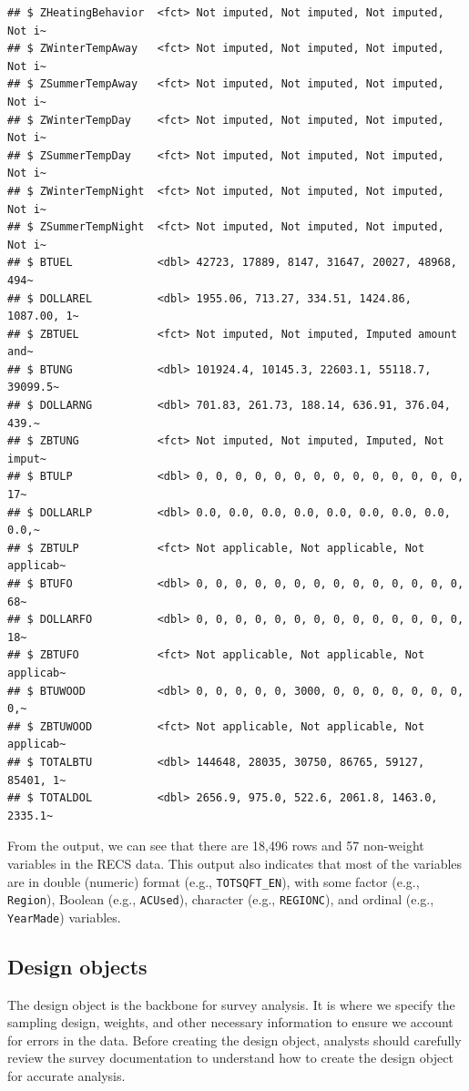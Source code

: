 \documentclass[
]{krantz}
\begin{document}
\begin{verbatim}
## $ ZHeatingBehavior  <fct> Not imputed, Not imputed, Not imputed, Not i~
## $ ZWinterTempAway   <fct> Not imputed, Not imputed, Not imputed, Not i~
## $ ZSummerTempAway   <fct> Not imputed, Not imputed, Not imputed, Not i~
## $ ZWinterTempDay    <fct> Not imputed, Not imputed, Not imputed, Not i~
## $ ZSummerTempDay    <fct> Not imputed, Not imputed, Not imputed, Not i~
## $ ZWinterTempNight  <fct> Not imputed, Not imputed, Not imputed, Not i~
## $ ZSummerTempNight  <fct> Not imputed, Not imputed, Not imputed, Not i~
## $ BTUEL             <dbl> 42723, 17889, 8147, 31647, 20027, 48968, 494~
## $ DOLLAREL          <dbl> 1955.06, 713.27, 334.51, 1424.86, 1087.00, 1~
## $ ZBTUEL            <fct> Not imputed, Not imputed, Imputed amount and~
## $ BTUNG             <dbl> 101924.4, 10145.3, 22603.1, 55118.7, 39099.5~
## $ DOLLARNG          <dbl> 701.83, 261.73, 188.14, 636.91, 376.04, 439.~
## $ ZBTUNG            <fct> Not imputed, Not imputed, Imputed, Not imput~
## $ BTULP             <dbl> 0, 0, 0, 0, 0, 0, 0, 0, 0, 0, 0, 0, 0, 0, 17~
## $ DOLLARLP          <dbl> 0.0, 0.0, 0.0, 0.0, 0.0, 0.0, 0.0, 0.0, 0.0,~
## $ ZBTULP            <fct> Not applicable, Not applicable, Not applicab~
## $ BTUFO             <dbl> 0, 0, 0, 0, 0, 0, 0, 0, 0, 0, 0, 0, 0, 0, 68~
## $ DOLLARFO          <dbl> 0, 0, 0, 0, 0, 0, 0, 0, 0, 0, 0, 0, 0, 0, 18~
## $ ZBTUFO            <fct> Not applicable, Not applicable, Not applicab~
## $ BTUWOOD           <dbl> 0, 0, 0, 0, 0, 3000, 0, 0, 0, 0, 0, 0, 0, 0,~
## $ ZBTUWOOD          <fct> Not applicable, Not applicable, Not applicab~
## $ TOTALBTU          <dbl> 144648, 28035, 30750, 86765, 59127, 85401, 1~
## $ TOTALDOL          <dbl> 2656.9, 975.0, 522.6, 2061.8, 1463.0, 2335.1~
\end{verbatim}

From the output, we can see that there are 18,496 rows and 57 non-weight variables in the RECS data. This output also indicates that most of the variables are in double (numeric) format (e.g., \texttt{TOTSQFT\_EN}), with some factor (e.g., \texttt{Region}), Boolean (e.g., \texttt{ACUsed}), character (e.g., \texttt{REGIONC}), and ordinal (e.g., \texttt{YearMade}) variables.

\hypertarget{setup-des-obj}{%
\subsection{Design objects}\label{setup-des-obj}}

The design object is the backbone for survey analysis. It is where we specify the sampling design, weights, and other necessary information to ensure we account for errors in the data. Before creating the design object, analysts should carefully review the survey documentation to understand how to create the design object for accurate analysis.
\end{document}
